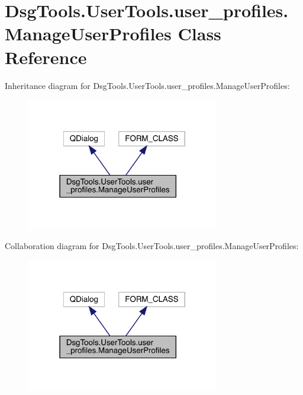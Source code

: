 \hypertarget{class_dsg_tools_1_1_user_tools_1_1user__profiles_1_1_manage_user_profiles}{}\section{Dsg\+Tools.\+User\+Tools.\+user\+\_\+profiles.\+Manage\+User\+Profiles Class Reference}
\label{class_dsg_tools_1_1_user_tools_1_1user__profiles_1_1_manage_user_profiles}


Inheritance diagram for Dsg\+Tools.\+User\+Tools.\+user\+\_\+profiles.\+Manage\+User\+Profiles\+:
\nopagebreak
\begin{figure}[H]
\begin{center}
\leavevmode
\includegraphics[width=238pt]{class_dsg_tools_1_1_user_tools_1_1user__profiles_1_1_manage_user_profiles__inherit__graph}
\end{center}
\end{figure}


Collaboration diagram for Dsg\+Tools.\+User\+Tools.\+user\+\_\+profiles.\+Manage\+User\+Profiles\+:
\nopagebreak
\begin{figure}[H]
\begin{center}
\leavevmode
\includegraphics[width=238pt]{class_dsg_tools_1_1_user_tools_1_1user__profiles_1_1_manage_user_profiles__coll__graph}
\end{center}
\end{figure}

